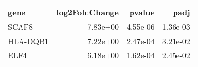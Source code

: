 \begin{tabular}{lrrr}
\toprule
    gene &  log2FoldChange &   pvalue &     padj \\
\midrule
   SCAF8 &        7.83e+00 & 4.55e-06 & 1.36e-03 \\
HLA-DQB1 &        7.22e+00 & 2.47e-04 & 3.21e-02 \\
    ELF4 &        6.18e+00 & 1.62e-04 & 2.45e-02 \\
\bottomrule
\end{tabular}
